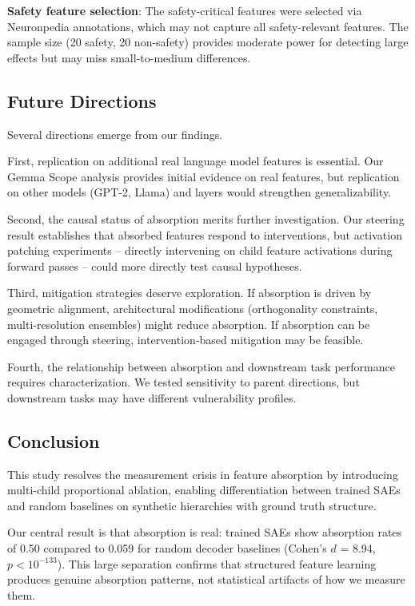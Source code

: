 \documentclass{article}
\begin{document}
\textbf{Safety feature selection}: The safety-critical features were selected via Neuronpedia annotations, which may not capture all safety-relevant features. The sample size (20 safety, 20 non-safety) provides moderate power for detecting large effects but may miss small-to-medium differences.

\subsection{Future Directions}

Several directions emerge from our findings.

First, replication on additional real language model features is essential. Our Gemma Scope analysis provides initial evidence on real features, but replication on other models (GPT-2, Llama) and layers would strengthen generalizability.

Second, the causal status of absorption merits further investigation. Our steering result establishes that absorbed features respond to interventions, but activation patching experiments -- directly intervening on child feature activations during forward passes -- could more directly test causal hypotheses.

Third, mitigation strategies deserve exploration. If absorption is driven by geometric alignment, architectural modifications (orthogonality constraints, multi-resolution ensembles) might reduce absorption. If absorption can be engaged through steering, intervention-based mitigation may be feasible.

Fourth, the relationship between absorption and downstream task performance requires characterization. We tested sensitivity to parent directions, but downstream tasks may have different vulnerability profiles.

\subsection{Conclusion}

This study resolves the measurement crisis in feature absorption by introducing multi-child proportional ablation, enabling differentiation between trained SAEs and random baselines on synthetic hierarchies with ground truth structure.

Our central result is that absorption is real: trained SAEs show absorption rates of 0.50 compared to 0.059 for random decoder baselines (Cohen's $d$ = 8.94, $p < 10^{-133}$). This large separation confirms that structured feature learning produces genuine absorption patterns, not statistical artifacts of how we measure them.
\end{document}
